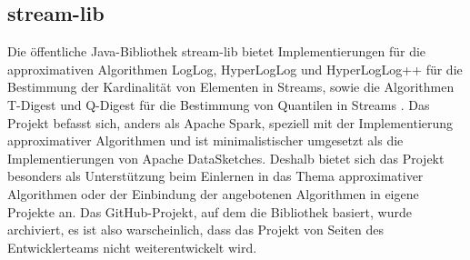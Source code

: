 \subsection{stream-lib}
Die öffentliche Java-Bibliothek stream-lib bietet Implementierungen für die approximativen Algorithmen LogLog, 
HyperLogLog und HyperLogLog++ für die Bestimmung der Kardinalität von Elementen in Streams, 
sowie die Algorithmen T-Digest und Q-Digest für die Bestimmung von Quantilen in Streams \cite{streamlib2019}. 
Das Projekt befasst sich, anders als Apache Spark, speziell mit der Implementierung approximativer Algorithmen und ist minimalistischer umgesetzt als die Implementierungen von Apache DataSketches. Deshalb bietet sich das Projekt besonders als Unterstützung beim Einlernen in das Thema approximativer Algorithmen oder der Einbindung der angebotenen Algorithmen in eigene Projekte an.
Das GitHub-Projekt, auf dem die Bibliothek basiert, wurde archiviert, 
es ist also warscheinlich, dass das Projekt von Seiten des Entwicklerteams nicht weiterentwickelt wird.
